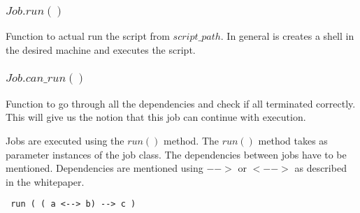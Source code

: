 \subsubsection*{$Job.run()$}
Function to actual run the script from $script\_path$. In general is creates a shell in the desired machine
and executes the script.
\subsubsection*{$Job.can\_run()$}
Function to go through all the dependencies and check if all terminated correctly. This will give us the notion
that this job can continue with execution.

Jobs are executed using the $run()$ method. The $run()$ method takes as parameter instances of the job class.
The dependencies between jobs have to be mentioned. Dependencies are mentioned using $-->$ or $<-->$ as described in the whitepaper.

\begin{verbatim}
 run ( ( a <--> b) --> c )
\end{verbatim}
